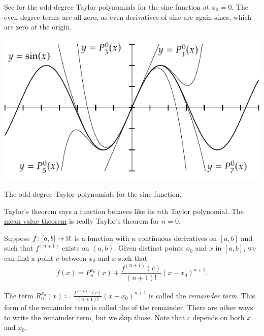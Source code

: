 See  for
the odd-degree Taylor polynomials for the sine function at $x_0=0$.
The even-degree terms are all zero, as even derivatives 
of sine are again sines, which are zero at the origin.
\begin{myfigureht}
\includegraphics{figures/taylorsin}
\caption{The odd degree Taylor polynomials for the sine
function.\label{fig:taylorsin}}
\end{myfigureht}

Taylor's theorem says a function behaves like its $n$th
Taylor polynomial.  The 
\hyperref[thm:mvt]{mean value theorem} is really Taylor's theorem
for $n=0$.

\begin{thm}[Taylor] \label{thm:taylor}
Suppose $f \colon [a,b] \to {\mathbb{R}}$ is a function with $n$ continuous
derivatives on $[a,b]$ and such that $f^{(n+1)}$ exists on $(a,b)$.
Given distinct points $x_0$ and $x$ in $[a,b]$,
we can find a point $c$ between $x_0$
and $x$ such that
\begin{equation*}
f(x)=P_{n}^{x_0}(x)+\frac{f^{(n+1)}(c)}{(n+1)!}{(x-x_0)}^{n+1} .
\end{equation*}
\end{thm}

The term $R_n^{x_0}(x)\coloneqq\frac{f^{(n+1)}(c)}{(n+1)!}{(x-x_0)}^{n+1}$ is called the
\emph{remainder term}.  This
form 
of the remainder term is called the
\emph{} of the remainder.  There are other ways
to write the remainder term, but we skip those.  Note that $c$ depends on
both $x$ and $x_0$.

